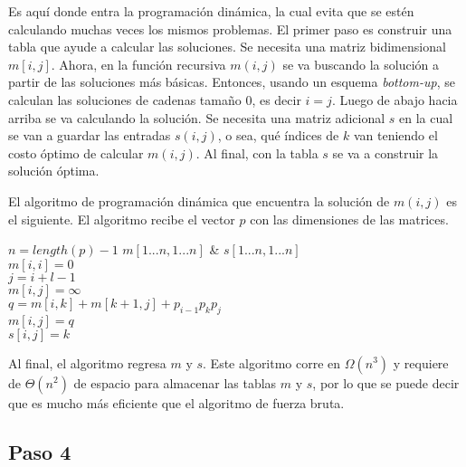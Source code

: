 \documentclass{article}
\begin{document}
Es aquí donde entra la programación dinámica, la cual evita que se estén calculando muchas veces los mismos problemas. El primer paso es construir una tabla que ayude a calcular las soluciones. Se necesita una matriz bidimensional $m[i,j]$. Ahora, en la función recursiva $m(i,j)$ se va buscando la solución a partir de las soluciones más básicas. Entonces, usando un esquema \emph{bottom-up}, se calculan las soluciones de cadenas tamaño 0, es decir $i=j$. Luego de abajo hacia arriba se va calculando la solución. Se necesita una matriz adicional $s$ en la cual se van a guardar las entradas $s(i, j)$, o sea, qué índices de $k$ van teniendo el costo óptimo de calcular $m(i,j)$. Al final, con la tabla $s$ se va a construir la solución óptima.

El algoritmo de programación dinámica que encuentra la solución de $m(i,j)$ es el siguiente. El algoritmo recibe el vector $p$ con las dimensiones de las matrices.

\begin{algorithm}
  \begin{algorithmic}
    \Require $n = length(p) - 1$
    \Ensure $m[1...n, 1...n]$ \& $s[1...n, 1...n]$
     \\
    \indent \indent $m[i,i] = 0$ 
    \EndFor
    \indent {} \\
    \indent \indent $ j = i + l - 1$ \\
    \indent \indent $m[i,j]  = \infty$ 
    \indent \indent {} \\
    \indent \indent \indent $q = m[i,k] + m[k+1,j] + p_{i-1} p_k p_j$
    \indent \indent \indent {} \\
    \indent \indent \indent \indent $m[i,j] = q$ \\
    \indent \indent \indent \indent $s[i,j] = k$
    \indent \indent \indent \EndIf
    \indent \indent \EndFor
    \indent \EndFor
    \EndFor
  \end{algorithmic}
\end{algorithm}

Al final, el algoritmo regresa $m$ y $s$. Este algoritmo corre en $\Omega(n^3)$ y requiere de $\Theta(n^2)$ de espacio para almacenar las tablas $m$ y $s$, por lo que se puede decir que es mucho más eficiente que el algoritmo de fuerza bruta.

\subsection*{Paso 4}
\end{document}
